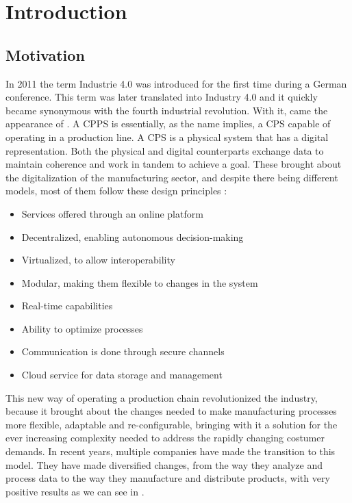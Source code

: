 


\chapter{Introduction}
\label{cha:introduction}

\section{Motivation}
\label{sec:motivation}

In 2011 the term Industrie 4.0 was introduced for the first time during a German conference. This term was later translated into Industry 4.0 and it quickly became synonymous with the fourth industrial revolution. With it, came the appearance of . A \acrshort{CPPS} is essentially, as the name implies, a \acrshort{CPS} capable of operating in a production line. A \acrlong{CPS} is a physical system that has a digital representation. Both the physical and digital counterparts exchange data to maintain coherence and work in tandem to achieve a goal. These  brought about the digitalization of the manufacturing sector, and despite there being different models, most of them follow these design principles \cite{birgit01}:

\begin{itemize}
	\item Services offered through an online platform
	\item Decentralized, enabling autonomous decision-making
	\item Virtualized, to allow interoperability
	\item Modular, making them flexible to changes in the system
	\item Real-time capabilities
	\item Ability to optimize processes
	\item Communication is done through secure channels
	\item Cloud service for data storage and management
\end{itemize}

This new way of operating a production chain revolutionized the industry, because it brought about the changes needed to make manufacturing processes more flexible, adaptable and re-configurable, bringing with it a solution for the ever increasing complexity needed to address the rapidly changing costumer demands.
In recent years, multiple companies have made the transition to this model. They have made diversified changes, from the way they analyze and process data to the way they manufacture and distribute products, with very positive results as we can see in \cite{rit01}. \\

